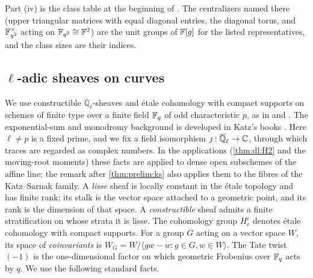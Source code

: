 \noindent Part (iv) is the class table at the beginning of
\cite[\S5.2]{FultonHarris}. The centralizers named there (upper triangular
matrices with equal diagonal entries, the diagonal torus, and
$\mathbb F_{q^2}^\times$ acting on $\mathbb F_{q^2}\cong\mathbb F^2$) are the unit groups of
$\mathbb F[g]$ for the listed representatives, and the class sizes are their
indices.

\subsection{\texorpdfstring{$\ell$}{l}-adic sheaves on curves}
\label{subsec:external:sheaves}

We use constructible $\overline{\mathbb Q}_\ell$-sheaves and \'etale
cohomology with compact supports on schemes of finite type over a finite
field $\mathbb F_q$ of odd characteristic $p$, as in \cite{SGA4half} and
\cite[\S1]{DeligneWeilII}. The exponential-sum and monodromy background is
developed in Katz's books \cite{KatzGKM,KatzESDE90,KatzTLM02,KatzMMP05}. Here $\ell\ne p$ is a
fixed prime, and we fix a field isomorphism
$\jmath:\overline{\mathbb Q}_\ell\to\mathbb C$, through which traces are regarded as
complex numbers. In the applications (\cref{thm:dl:H2} and the moving-root
moments) these facts are applied to dense open subschemes of the affine
line; the remark after \cref{thm:prelim:ks} also applies them to the fibres
of the Katz--Sarnak family.
A \emph{lisse} sheaf is locally constant in the \'etale topology and has
finite rank; its stalk is the vector space attached to a geometric point,
and its rank is the dimension of that space. A \emph{constructible} sheaf
admits a finite stratification on whose strata it is lisse. The cohomology
group $H^i_c$ denotes \'etale cohomology with compact supports. For a group
$G$ acting on a vector space $W$, its space of \emph{coinvariants} is
$W_G=W/\langle gw-w:g\in G,w\in W\rangle$. The Tate twist $(-1)$ is the
one-dimensional factor on which geometric Frobenius over $\mathbb F_q$ acts by $q$.
We use the following standard facts.
